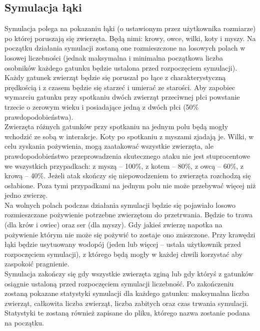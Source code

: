 \documentclass[10pt,a4paper]{article}
\begin{document}
		\subsection{Symulacja łąki}
			\indent		
		Symulacja polega na pokazaniu łąki (o ustawionym przez użytkownika rozmiarze) po której poruszają się zwierzęta. Będą nimi: krowy, owce, wilki, koty i myszy. Na początku działania symulacji zostaną one rozmieszczone na losowych polach w losowej liczebności (jednak maksymalna i minimalna początkowa liczba osobników każdego gatunku będzie ustalona przed rozpoczęciem symulacji). Każdy gatunek zwierząt będzie się poruszał po łące z charakterystyczną prędkością i z czasem będzie się starzeć i umierać ze starości. Aby zapobiec wymarciu gatunku przy spotkaniu dwóch zwierząt przeciwnej płci powstanie trzecie o zerowym wieku i posiadające jedną z dwóch płci (50\% prawdopodobieństwa). \\
			\indent
Zwierzęta różnych gatunków przy spotkaniu na jednym polu będą mogły wchodzić ze sobą w interakcje. Koty po spotkaniu z myszami zjadają je. Wilki, w celu zyskania pożywienia, mogą zaatakować wszystkie zwierzęta, ale prawdopodobieństwo przeprowadzenia skutecznego ataku nie jest stuprocentowe we wszystkich przypadkach: z myszą – 100\%, z kotem – 80\%, z owcą – 60\%, z krową – 40\%. Jeżeli atak skończy się niepowodzeniem to zwierzęta rozchodzą się osłabione. Poza tymi przypadkami na jednym polu nie może przebywać więcej niż jedno zwierzę. \\
			\indent
Na wolnych polach podczas działania symulacji będzie się pojawiało losowo rozmieszczane pożywienie potrzebne zwierzętom do przetrwania. Będzie to trawa (dla krów i owiec) oraz ser (dla myszy). Gdy jakieś zwierzę napotka na pożywienie którym nie może się pożywić to zostaje ono zniszczone. Przy krawędzi łąki będzie usytuowany wodopój (jeden lub więcej – ustala użytkownik przed rozpoczęciem symulacji), z którego będą mogły w każdej chwili korzystać aby zaspokoić pragnienie. \\
			\indent
Symulacja zakończy się gdy wszystkie zwierzęta zginą lub gdy któryś z gatunków osiągnie ustaloną przed rozpoczęciem symulacji liczebność. Po zakończeniu zostaną pokazane statystyki symulacji dla każdego gatunku: maksymalna liczba zwierząt, całkowita liczba zwierząt, liczba zabitych oraz czas trwania symulacji. Statystyki te zostaną również zapisane do pliku, którego nazwa zostanie podana na początku.
\end{document}
